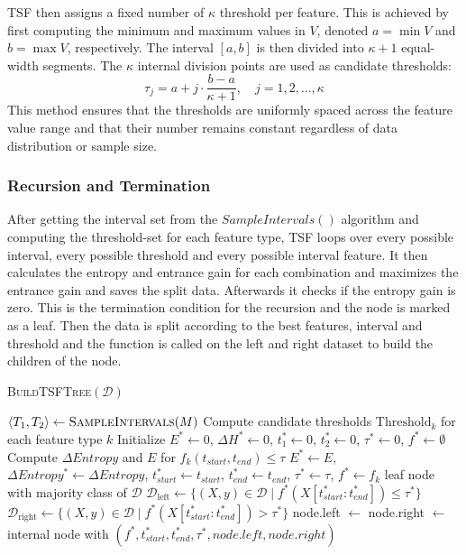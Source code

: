 TSF then assigns a fixed number of $\kappa$ threshold per feature.
This is achieved by first computing the minimum and 
maximum values in $V$, denoted $a = \min V$ and 
$b = \max V$, respectively. The interval $[a, b]$ 
is then divided into $\kappa + 1$ equal-width segments.
The $\kappa$ internal division points are used as 
candidate thresholds:
\begin{equation*}
\tau_j = a + j \cdot \frac{b - a}{\kappa + 1}, \quad j = 1, 2, \dots, \kappa
\end{equation*}
This method ensures that the thresholds are uniformly 
spaced across the feature value range and that their 
number remains constant regardless of data distribution or 
sample size. 

\subsubsection*{Recursion and Termination}
After getting the interval set from the $SampleIntervals()$ algorithm and computing the threshold-set for each feature type,
TSF loops over every possible interval, every possible threshold and every possible interval feature.
It then calculates the entropy and entrance gain for each combination and maximizes the entrance gain and saves the split data.
Afterwards it checks if the entropy gain is zero. This is the termination condition for the recursion and the node
is marked as a leaf. Then the data is split according to the best features, interval and threshold and the 
function is called on the left and right dataset to build the children of the node.
\begin{algorithm}[H]
\caption{\textsc{BuildTSFTree}$(\mathcal{D})$}
\begin{algorithmic}[1]
\State $\langle T_1, T_2 \rangle \gets \textsc{SampleIntervals}(M)$
\State Compute candidate thresholds $\text{Threshold}_k$ for each feature type $k$
\State Initialize $E^* \gets 0$, $\Delta H^* \gets 0$, $t_1^* \gets 0$, $t_2^* \gets 0$, $\tau^* \gets 0$, $f^* \gets \emptyset$
            \State Compute $\Delta Entropy$ and $E$ for $f_k(t_{start}, t_{end}) \le \tau$
                \State $E^* \gets E$, 
				\State $\Delta Entropy^* \gets \Delta Entropy$, 
				\State $t_{start}^* \gets t_{start}$, 
				\State $t_{end}^* \gets t_{end}$, 
				\State $\tau^* \gets \tau$, 
				\State $f^* \gets f_k$
            \EndIf
        \EndFor
    \EndFor
\EndFor
{}
    \State \Return leaf node with majority class of $\mathcal{D}$
\EndIf
\State $\mathcal{D}_{\text{left}} \gets \{(X, y) \in \mathcal{D} \mid f^*(X[t_{start}^*:t_{end}^*]) \le \tau^* \}$
\State $\mathcal{D}_{\text{right}} \gets \{(X, y) \in \mathcal{D} \mid f^*(X[t_{start}^*:t_{end}^*]) > \tau^* \}$
\State node.left $\gets$ 
\State node.right $\gets$ 
\State \Return internal node with $(f^*, t_{start}^*, t_{end}^*, \tau^*, node.left, node.right)$
\end{algorithmic}
\end{algorithm}

